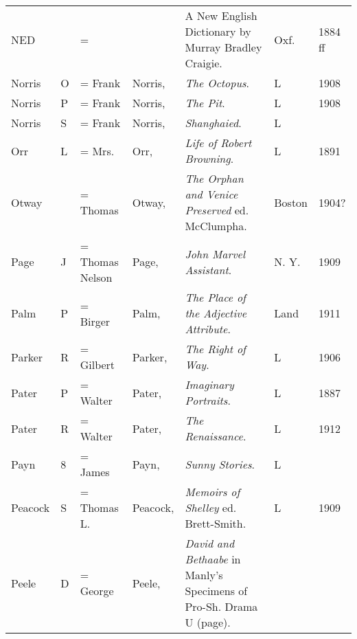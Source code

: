 \begin{sidewaystable}
\centering
\begin{tabular}{p{} p{} p{} p{} p{} p{} p{}}
NED & & = & & A New English Dictionary by Murray Bradley Craigie. & Oxf. & 1884 ff \\
Norris & O & = Frank & Norris, & \textit{The Octopus}. & L & 1908 \\
Norris & P & = Frank & Norris, & \textit{The Pit}. & L & 1908 \\
Norris & S & = Frank & Norris, & \textit{Shanghaied}. & L & \\
Orr & L & = Mrs. & Orr, & \textit{Life of Robert Browning}. & L & 1891 \\
Otway & & = Thomas & Otway, & \textit{The Orphan and Venice Preserved} ed. McClumpha. & Boston & 1904? \\
Page & J & = Thomas Nelson & Page, & \textit{John Marvel Assistant}. & N. Y. & 1909 \\
Palm & P & = Birger & Palm, & \textit{The Place of the Adjective Attribute}. & Land & 1911 \\
Parker & R & = Gilbert & Parker, & \textit{The Right of Way}. & L & 1906 \\
Pater & P & = Walter & Pater, & \textit{Imaginary Portraits}. & L & 1887 \\
Pater & R & = Walter & Pater, & \textit{The Renaissance}. & L & 1912 \\
Payn & 8 & = James & Payn, & \textit{Sunny Stories}. & L & \\
Peacock & S & = Thomas L. & Peacock, & \textit{Memoirs of Shelley} ed. Brett-Smith. & L & 1909 \\
Peele & D & = George & Peele, & \textit{David and Bethaabe} in Manly's Specimens of Pro-Sh. Drama U (page). & & \\
\end{tabular}
\end{sidewaystable}



